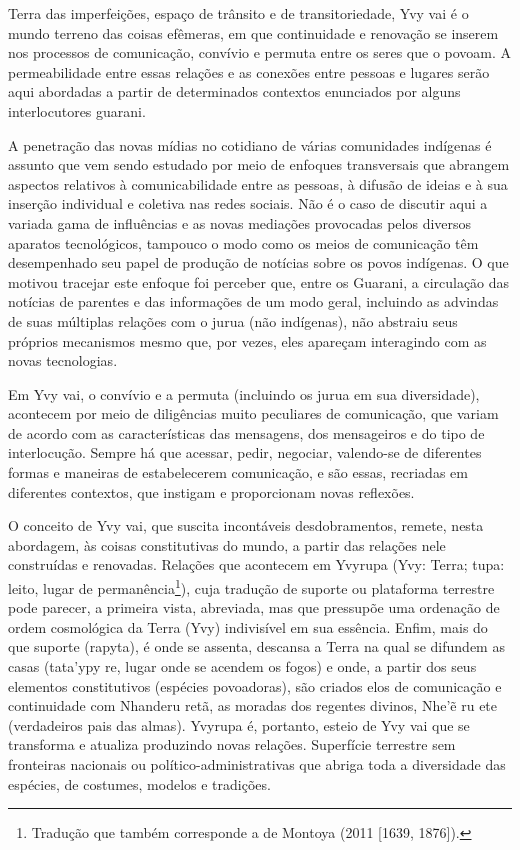 Terra das imperfeições, espaço de trânsito e de transitoriedade, Yvy vai
é o mundo terreno das coisas efêmeras, em que continuidade e renovação
se inserem nos processos de comunicação, convívio e permuta entre os
seres que o povoam. A permeabilidade entre essas relações e as conexões
entre pessoas e lugares serão aqui abordadas a partir de determinados
contextos enunciados por alguns interlocutores guarani. 

A penetração das novas mídias no cotidiano de várias comunidades
indígenas é assunto que vem sendo estudado por meio de enfoques
transversais que abrangem aspectos relativos à comunicabilidade entre
as pessoas, à difusão de ideias e à sua inserção individual e coletiva
nas redes sociais. Não é o caso de discutir aqui a variada gama de
influências e as novas mediações provocadas pelos diversos aparatos
tecnológicos, tampouco o modo como os meios de comunicação têm
desempenhado seu papel de produção de notícias sobre os povos
indígenas. O que motivou tracejar este enfoque foi perceber que, entre
os Guarani, a circulação das notícias de parentes e das informações de
um modo geral, incluindo as advindas de suas múltiplas relações com o
jurua (não indígenas), não abstraiu seus próprios mecanismos mesmo que,
por vezes, eles apareçam interagindo com as novas tecnologias.

Em Yvy vai, o convívio e a permuta (incluindo os jurua em sua
diversidade), acontecem por meio de diligências muito peculiares de
comunicação, que variam de acordo com as características das mensagens,
dos mensageiros e do tipo de interlocução. Sempre há que acessar,
pedir, negociar, valendo-se de diferentes formas e maneiras de
estabelecerem comunicação, e são essas, recriadas em diferentes
contextos, que instigam e proporcionam novas reflexões. 

O conceito de Yvy vai, que suscita incontáveis desdobramentos, remete,
nesta abordagem, às coisas constitutivas do mundo, a partir das
relações nele construídas e renovadas. Relações que acontecem em
Yvyrupa (Yvy: Terra; tupa: leito, lugar de
permanência\footnote{Tradução que também corresponde a de Montoya (2011
[1639, 1876]). }), cuja tradução de suporte ou plataforma terrestre
pode parecer, a primeira vista, abreviada, mas que pressupõe uma
ordenação de ordem cosmológica da Terra (Yvy) indivisível em sua
essência. Enfim, mais do que suporte (rapyta), é onde se assenta,
descansa a Terra na qual se difundem as casas (tata’ypy re, lugar onde
se acendem os fogos) e onde, a partir dos seus elementos constitutivos
(espécies povoadoras), são criados elos de comunicação e continuidade
com Nhanderu retã, as moradas dos regentes divinos, Nhe’ẽ ru ete
(verdadeiros pais das almas). Yvyrupa é, portanto, esteio de Yvy vai
que se transforma e atualiza produzindo novas relações. Superfície
terrestre sem fronteiras nacionais ou político-administrativas que
abriga toda a diversidade das espécies, de costumes, modelos e
tradições. 

